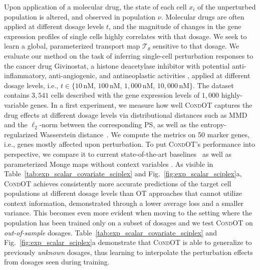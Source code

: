  Upon application of a molecular drug, the state of each cell $x_i$ of the unperturbed population is altered, and observed in population $\nu$.
Molecular drugs are often applied at different dosage levels $t$, and the magnitude of changes in the gene expression profiles of single cells highly correlates with that dosage. 
We seek to learn a global, parameterized transport map $\mathcal{T}_\theta$ sensitive to that dosage.%
We evaluate our method on the task of inferring single-cell perturbation responses to the cancer drug Givinostat, a histone deacetylase inhibitor with potential anti-inflammatory, anti-angiogenic, and antineoplastic activities \citep{srivatsan2020massively}, applied at different dosage levels, i.e., $t \in \{10\,$nM, $100\,$nM, $1,000\,$nM, $10,000\,$nM$\}$. The dataset contains $3,541$ cells described with the gene expression levels of $1,000$ highly-variable genes.
In a first experiment, we measure how well \textsc{CondOT} captures the drug effects at different dosage levels via distributional distances such as MMD~\citep{gretton2012kernel} and the $\ell_2$-norm between the corresponding \acrfull{PS}, as well as the entropy-regularized Wasserstein distance~\citep{cuturi2013sinkhorn}. We compute the metrics on 50 marker genes, i.e., genes mostly affected upon perturbation.
To put \textsc{CondOT}'s performance into perspective, we compare it to current state-of-the-art baselines~\citep{lotfollahi2021compositional} as well as parameterized Monge maps without context variables \citep[\textsc{ICNN OT}]{bunne2021learning, makkuva2020optimal}.
As visible in Table~\ref{tab:exp_scalar_covariate_sciplex} and Fig.~\ref{fig:exp_scalar_sciplex}a, \textsc{CondOT} achieves consistently more accurate predictions of the target cell populations at different dosage levels than OT approaches that cannot utilize context information, demonstrated through a lower average loss and a smaller variance.
This becomes even more evident when moving to the setting where the population has been trained only on a subset of dosages and we test \textsc{CondOT} on \emph{out-of-sample} dosages. Table~\ref{tab:exp_scalar_covariate_sciplex} and Fig.~\ref{fig:exp_scalar_sciplex}a demonstrate that \textsc{CondOT} is able to generalize to previously \emph{unknown} dosages, thus learning to interpolate the perturbation effects from dosages seen during training.

